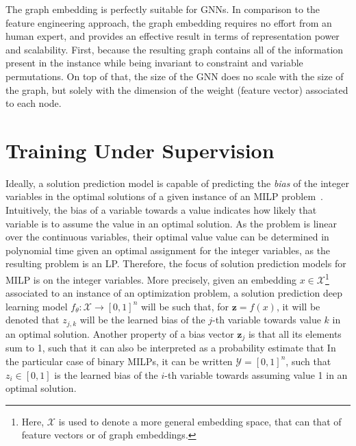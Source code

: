 The graph embedding is perfectly suitable for GNNs.
In comparison to the feature engineering approach, the graph embedding requires no effort from an human expert, and provides an effective result in terms of representation power and scalability.
First, because the resulting graph contains all of the information present in the instance while being invariant to constraint and variable permutations.
On top of that, the size of the GNN does no scale with the size of the graph, but solely with the dimension of the weight (feature vector) associated to each node.


\section{Training Under Supervision}

Ideally, a solution prediction model is capable of predicting the \emph{bias} of the integer variables in the optimal solutions of a given instance of an MILP problem~\cite{khalilMIPGNNDataDrivenFramework2022}.
Intuitively, the bias of a variable towards a value indicates how likely that variable is to assume the value in an optimal solution.
As the problem is linear over the continuous variables, their optimal value value can be determined in polynomial time given an optimal assignment for the integer variables, as the resulting problem is an LP.
Therefore, the focus of solution prediction models for MILP is on the integer variables.
More precisely, given an embedding $x\in \mathcal{X}$\footnote{Here, $\mathcal{X}$ is used to denote a more general embedding space, that can that of feature vectors or of graph embeddings.} associated to an instance of an optimization problem, a solution prediction deep learning model $f_{\theta}: \mathcal{X} \longrightarrow \left[ 0,1 \right]^n$ will be such that, for $\bm{z}=f(x)$, it will be denoted that $z_{j,k}$ will be the learned bias of the $j$-th variable towards value $k$ in an optimal solution.
Another property of a bias vector $\bm{z}_{j}$ is that all its elements sum to 1, such that it can also be interpreted as a probability estimate that 
In the particular case of binary MILPs, it can be written $\mathcal{Y}=[0,1]^n$, such that $z_{i}\in [0,1]$ is the learned bias of the $i$-th variable towards assuming value 1 in an optimal solution.

